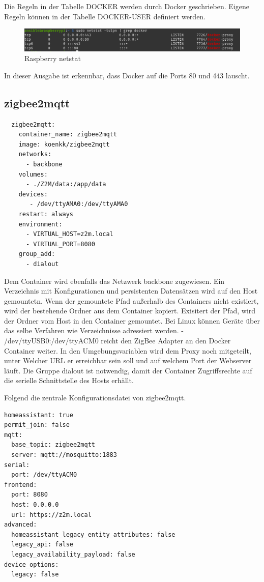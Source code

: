 Die Regeln in der Tabelle \grqq DOCKER \grqq{} werden durch Docker geschrieben. Eigene Regeln können in der Tabelle 
\grqq DOCKER-USER \grqq{} definiert werden.

\begin{figure}[H]
  \centering
  \includegraphics[width=1\textwidth]{media/rasp-netstat.png}
  \caption{Raspberry netstat}
\end{figure}

In dieser Ausgabe ist erkennbar, dass Docker auf die Ports 80 und 443 lauscht.

\subsection{zigbee2mqtt}
\begin{lstlisting}
  zigbee2mqtt:
    container_name: zigbee2mqtt
    image: koenkk/zigbee2mqtt
    networks:
      - backbone
    volumes:
      - ./Z2M/data:/app/data
    devices:
       - /dev/ttyAMA0:/dev/ttyAMA0
    restart: always
    environment:
      - VIRTUAL_HOST=z2m.local
      - VIRTUAL_PORT=8080
    group_add:
      - dialout
\end{lstlisting}

Dem Container wird ebenfalls das Netzwerk \grqq backbone\grqq{} zugewiesen. Ein Verzeichnis mit Konfigurationen und persistenten Datensätzen wird auf den Host gemountetn. Wenn der gemountete Pfad außerhalb des Containers nicht existiert, wird der 
bestehende Ordner aus dem Container kopiert. Exisitert der Pfad, wird der Ordner vom Host in den Container gemountet. 
Bei Linux können Geräte über das selbe Verfahren wie Verzeichnisse adressiert werden. \grqq - /dev/ttyUSB0:/dev/ttyACM0\grqq{} reicht den ZigBee Adapter an 
den Docker Container weiter.
In den Umgebungsvariablen wird dem Proxy noch mitgeteilt, unter Welcher URL er erreichbar sein soll und auf welchem Port der Webserver läuft. Die Gruppe 
\grqq dialout\grqq{} ist notwendig, damit der Container Zugriffsrechte auf die serielle Schnittstelle des Hosts erhällt.

Folgend die zentrale Konfigurationsdatei von \grqq zigbee2mqtt\grqq{}.
\begin{lstlisting}
homeassistant: true
permit_join: false
mqtt:
  base_topic: zigbee2mqtt
  server: mqtt://mosquitto:1883
serial:
  port: /dev/ttyACM0
frontend:
  port: 8080
  host: 0.0.0.0
  url: https://z2m.local
advanced:
  homeassistant_legacy_entity_attributes: false
  legacy_api: false
  legacy_availability_payload: false
device_options:
  legacy: false
\end{lstlisting}

